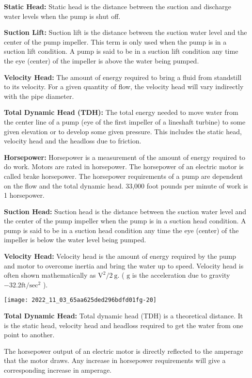 \textbf{Static Head: }  Static head is the distance between the suction and discharge water levels when the pump is shut off. 

\textbf{Suction Lift: } Suction lift is the distance between the suction water level and the center of the pump impeller. This term is only used when the pump is in a suction lift condition. A pump is said to be in a suction lift condition any time the eye (center) of the impeller is above the water being pumped.

\textbf{Velocity Head: } The amount of energy required to bring a fluid from standstill to its velocity. For a given quantity of flow, the velocity head will vary indirectly with the pipe diameter.

\textbf{Total Dynamic Head (TDH):}  The total energy needed to move water from the center line of a pump (eye of the first impeller of a lineshaft turbine) to some given elevation or to develop some given pressure. This includes the static head, velocity head and the headloss due to friction. 

\textbf{Horsepower: } Horsepower is a measurement of the amount of energy required to do work. Motors are rated in horsepower. The horsepower of an electric motor is called brake horsepower. The horsepower requirements of a pump are dependent on the flow and the total dynamic head.  33,000 foot pounds per minute of work is 1 horsepower.

\textbf{Suction Head: } Suction head is the distance between the suction water level and the center of the pump impeller when the pump is in a suction head condition. A pump is said to be in a suction head condition any time the eye (center) of the impeller is below the water level being pumped.

\textbf{Velocity Head: } Velocity head is the amount of energy required by the pump and motor to overcome inertia and bring the water up to speed. Velocity head is often shown mathematically as $\mathrm{V}^{2} / 2 \mathrm{~g}$. ( $\mathrm{g}$ is the acceleration due to gravity $-32.2 \mathrm{ft} / \mathrm{sec}^{2}$ ).
\begin{center}
\texttt{[image: 2022\_11\_03\_65aa625ded296bdfd01fg-20]}
\end{center}
\textbf{Total Dynamic Head: }  Total dynamic head (TDH) is a theoretical distance. It is the static head, velocity head and headloss required to get the water from one point to another.

The horsepower output of an electric motor is directly reflected to the amperage that the motor draws. Any increase in horsepower requirements will give a corresponding increase in amperage.

